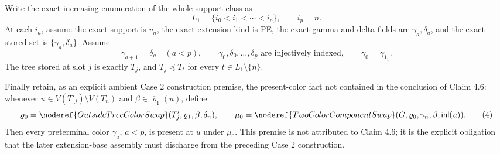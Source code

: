 \begin{lemma}
Write the exact increasing enumeration of the whole support class as
\[
 L_1=\{i_0<i_1<\cdots<i_p\},\qquad i_p=n.                    \tag{2}
\]
At each \(i_a\), assume the exact support is \(v_n\), the exact extension
kind is PE, the exact gamma and delta fields are
\(\gamma_a,\delta_a\), and the exact stored set is
\(\{\gamma_a,\delta_a\}\).  Assume
\[
 \gamma_{a+1}=\delta_a\quad(a<p),\qquad
 \gamma_0,\delta_0,\ldots,\delta_p
 \text{ are injectively indexed},\qquad
 \gamma_0=\gamma_{1_1}.                                     \tag{3}
\]
The tree stored at slot \(j\) is exactly \(T_j\), and \(T_j\preccurlyeq
T_t\) for every \(t\in L_1\setminus\{n\}\).

Finally retain, as an explicit ambient Case 2 construction premise, the
present-color fact not contained in the conclusion of Claim 4.6: whenever
\(u\in V(T'_j)\setminus V(T_n)\) and
\(\beta\in\overline{\varrho}_1(u)\), define
\[
 \varrho_0=\noderef{OutsideTreeColorSwap}
   (T'_j,\varrho_1,\beta,\delta_n),\qquad
 \mu_0=\noderef{TwoColorComponentSwap}
   (G,\varrho_0,\gamma_n,\beta,\mathsf{inl}(u)).              \tag{4}
\]
Then every preterminal color \(\gamma_a\), \(a<p\), is present at \(u\)
under \(\mu_0\).  This premise is not attributed to Claim 4.6; it is the
explicit obligation that the later extension-base assembly must discharge
from the preceding Case 2 construction.


\end{lemma}
